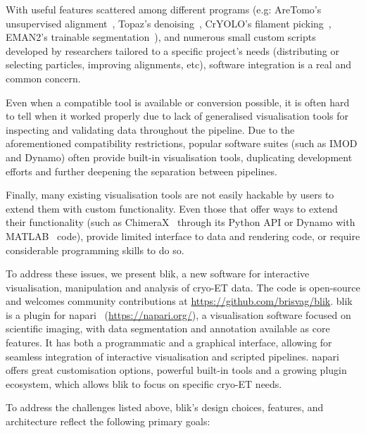With useful features scattered among different programs (e.g: AreTomo's unsupervised alignment~\cite{zhengAreTomoIntegratedSoftware2022}, Topaz's denoising~\cite{beplerTopazDenoiseGeneralDeep2020}, CrYOLO's filament picking~\cite{wagnerSPHIREcrYOLOFastAccurate2019}, EMAN2's trainable segmentation~\cite{galaz-montoyaSingleParticleTomography2015}), and numerous small custom scripts developed by researchers tailored to a specific project's needs (distributing or selecting particles, improving alignments, etc), software integration is a real and common concern.

Even when a compatible tool is available or conversion possible, it is often hard to tell when it worked properly due to lack of generalised visualisation tools for inspecting and validating data throughout the pipeline. Due to the aforementioned compatibility restrictions, popular software suites (such as IMOD and Dynamo) often provide built-in visualisation tools, duplicating development efforts and further deepening the separation between pipelines.

Finally, many existing visualisation tools are not easily hackable by users to extend them with custom functionality. Even those that offer ways to extend their functionality (such as ChimeraX~\cite{pettersenUCSFChimeraXStructure2021} through its Python API or Dynamo with MATLAB~\cite{MATLAB} code), provide limited interface to data and rendering code, or require considerable programming skills to do so.

\vspace{\baselineskip}

To address these issues, we present blik, a new software for interactive visualisation, manipulation and analysis of cryo-ET data. The code is open-source and welcomes community contributions at \url{https://github.com/brisvag/blik}. blik is a plugin for napari~\cite{thenaparicommunityNapariMultidimensionalImage2024} (\url{https://napari.org/}), a visualisation software focused on scientific imaging, with data segmentation and annotation available as core features. It has both a programmatic and a graphical interface, allowing for seamless integration of interactive visualisation and scripted pipelines. napari offers great customisation options, powerful built-in tools and a growing plugin ecosystem, which allows blik to focus on specific cryo-ET needs.

To address the challenges listed above, blik's design choices, features, and architecture reflect the following primary goals:

